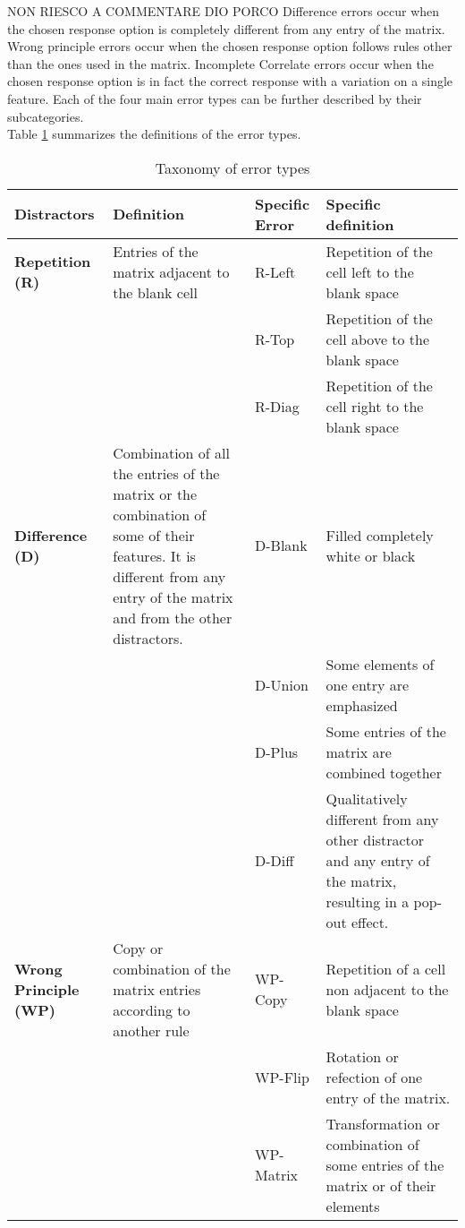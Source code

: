 {
NON RIESCO A COMMENTARE DIO PORCO
}
Difference errors occur when the chosen response option is completely different from any entry of the matrix.
Wrong principle errors occur when the chosen response option follows rules other than the ones used in the matrix.
Incomplete Correlate errors occur when the chosen response option is in fact the correct response with a variation on a single feature.
Each of the four main error types can be further described by their subcategories.\\
Table \ref{tab:tab-error-types-static} summarizes the definitions of the error types.

\begin{table}

\caption{\label{tab:tab-error-types-static}Taxonomy of error types}
\centering
\begin{tabular}[t]{>{}l|l|l|l}
\hline
Distractors & Definition & Specific Error & Specific definition\\
\hline
\textbf{Repetition (R)} & Entries of the matrix adjacent to the blank cell & R-Left & Repetition of the cell left to the blank space\\
\hline
\textbf{} &  & R-Top & Repetition of the cell above to the blank space\\
\hline
\textbf{} &  & R-Diag & Repetition of the cell right to the blank space\\
\hline
\textbf{Difference (D)} & Combination of all the entries of the matrix or the combination of some of their features. It is different from any entry of the matrix and from the other distractors. & D-Blank & Filled completely white or black\\
\hline
\textbf{} &  & D-Union & Some elements of one entry are emphasized\\
\hline
\textbf{} &  & D-Plus & Some entries of the matrix are combined together\\
\hline
\textbf{} &  & D-Diff & Qualitatively different from any other distractor and any entry of the matrix, resulting in a pop-out effect.\\
\hline
\textbf{Wrong Principle (WP)} & Copy or combination of the matrix entries according to another rule & WP-Copy & Repetition of a cell non adjacent to the blank space\\
\hline
\textbf{} &  & WP-Flip & Rotation or refection of one entry of the matrix.\\
\hline
\textbf{} &  & WP-Matrix & Transformation or combination of some entries of the matrix or of their elements\\

\end{tabular}
\end{table}
